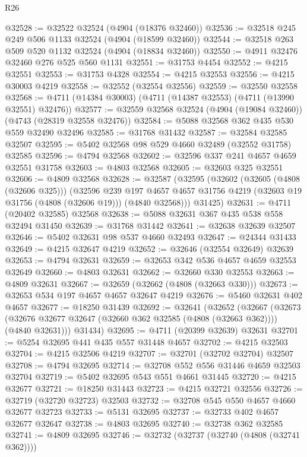 \begin{lexlean}{R26}
\begin{coremodule}
@32528 := @32522 @32524 (@4904 (@18376 @32460))
@32536 := @32518 @245 @249 @506 @1133 @32524 (@4904 (@18599 @32460))
@32544 := @32518 @263 @509 @520 @1132 @32524 (@4904 (@18834 @32460))
@32550 := @4911 @32476 @32460 @276 @525 @560 @1131
@32551 := @31753 @4454
@32552 := @4215 @32551
@32553 := @31753 @4328
@32554 := @4215 @32553
@32556 := @4215 @30003 @4219
@32558 := @32552 (@32554 @32556)
@32559 := @32550 @32558
@32568 := @4711 (@14384 @30003) (@4711 (@14387 @32553) (@4711 (@13990 @32551) @32476))
@32577 := @32559 @32568 @32524 (@4904 (@19084 @32460)) (@4743 (@28319 @32558 @32476))
@32584 := @5088 @32568 @362 @435 @530 @559 @32490 @32496
@32585 := @31768 @31432
@32587 := @32584 @32585 @32507
@32595 := @5402 @32568 @98 @529 @4660 @32489 (@32552 @31758) @32585
@32596 := @4794 @32568
@32602 := @32596 @337 @241 @4657 @4659 @32551 @31758
@32603 := @4803 @32568
@32605 := @32603 @325 @32551
@32606 := @4809 @32568
@32628 := @32587
    (@32595
      (@32602
        (@32605 (@4808 (@32606 @325)))
        (@32596
          @239
          @197
          @4657
          @4657
          @31756
          @4219
          (@32603 @19 @31756 (@4808 (@32606 @19)))
          (@4840 @32568)))
      @31425)
@32631 := @4711 (@20402 @32585) @32568
@32638 := @5088 @32631 @367 @435 @538 @558 @32494 @31450
@32639 := @31768 @31442
@32641 := @32638 @32639 @32507
@32646 := @5402 @32631 @98 @537 @4660 @32493
@32647 := @24344 @31433
@32649 := @4215 @32647 @4219
@32652 := @32646 (@32554 @32649) @32639
@32653 := @4794 @32631
@32659 := @32653 @342 @536 @4657 @4659 @32553 @32649
@32660 := @4803 @32631
@32662 := @32660 @330 @32553
@32663 := @4809 @32631
@32667 := @32659 (@32662 (@4808 (@32663 @330)))
@32673 := @32653 @534 @197 @4657 @4657 @32647 @4219
@32676 := @5460 @32631 @402 @4657
@32677 := @18250 @31439
@32692 := @32641
    (@32652
      (@32667
        (@32673 (@32676 @32677 @32647 (@32660 @362 @32585 (@4808 (@32663 @362)))) (@4840 @32631)))
      @31434)
@32695 := @4711 (@20399 @32639) @32631
@32701 := @5254 @32695 @441 @435 @557 @31448 @4657
@32702 := @4215 @32503
@32704 := @4215 @32506 @4219
@32707 := @32701 (@32702 @32704) @32507
@32708 := @4794 @32695
@32714 := @32708 @552 @556 @31446 @4659 @32503 @32704
@32719 := @5402 @32695 @543 @551 @4661 @31445
@32720 := @4215 @32677
@32721 := @18250 @31443
@32723 := @4215 @32721 @32556
@32726 := @32719 (@32720 @32723) @32503
@32732 := @32708 @545 @550 @4657 @4660 @32677 @32723
@32733 := @5131 @32695
@32737 := @32733 @402 @4657 @32677 @32647
@32738 := @4803 @32695
@32740 := @32738 @362 @32585
@32741 := @4809 @32695
@32746 := @32732 (@32737 (@32740 (@4808 (@32741 @362))))

\end{coremodule}
\end{lexlean}
